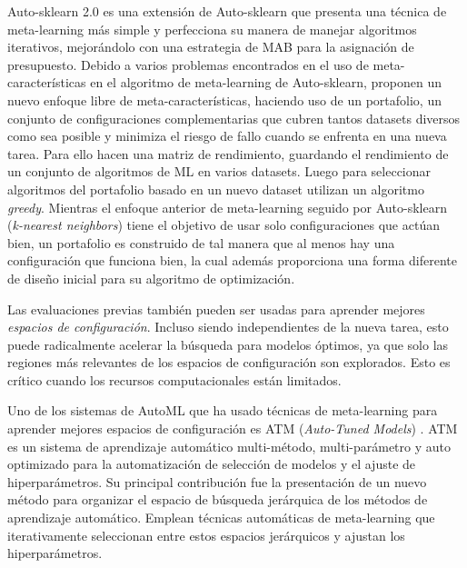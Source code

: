 \documentclass[a4paper,10pt,twocolumn]{article}
\begin{document}
Auto-sklearn 2.0 \cite{Feurer2020AutoSklearn2T} es una extensión de Auto-sklearn que presenta una técnica de meta-learning más simple y perfecciona su manera de manejar algoritmos iterativos, mejorándolo con una estrategia de MAB para la asignación de presupuesto. Debido a varios problemas encontrados en el uso de meta-características en el algoritmo de meta-learning de Auto-sklearn, proponen un nuevo enfoque libre de meta-características, haciendo uso de un portafolio, un conjunto de configuraciones complementarias que cubren tantos datasets diversos como sea posible y minimiza el riesgo de fallo cuando se enfrenta en una nueva tarea. Para ello hacen una matriz de rendimiento, guardando el rendimiento de un conjunto de algoritmos de ML en varios datasets. Luego para seleccionar algoritmos del portafolio basado en un nuevo dataset utilizan un algoritmo \textit{greedy}. Mientras el enfoque anterior de meta-learning seguido por Auto-sklearn (\textit{k-nearest neighbors}) tiene el objetivo de usar solo configuraciones que actúan bien, un portafolio es construido de tal manera que al menos hay una configuración que funciona bien, la cual además proporciona una forma diferente de diseño inicial para su algoritmo de optimización.

Las evaluaciones previas también pueden ser usadas para aprender mejores \textit{espacios de configuración}. Incluso siendo independientes de la nueva tarea, esto puede radicalmente acelerar la búsqueda para modelos óptimos, ya que solo las regiones más relevantes de los espacios de configuración son explorados. Esto es crítico cuando los recursos computacionales están limitados. 

Uno de los sistemas de AutoML que ha usado técnicas de meta-learning para aprender mejores espacios de configuración es ATM (\textit{Auto-Tuned Models}) \cite{mendoza2016towards}. ATM es un sistema de aprendizaje automático multi-método, multi-parámetro y auto optimizado para la automatización de selección de modelos y el ajuste de hiperparámetros. Su principal contribución fue la presentación de un nuevo método para organizar el espacio de búsqueda jerárquica de los métodos de aprendizaje automático. 
 Emplean técnicas automáticas de meta-learning que iterativamente seleccionan entre estos espacios jerárquicos y ajustan los hiperparámetros.
\end{document}
